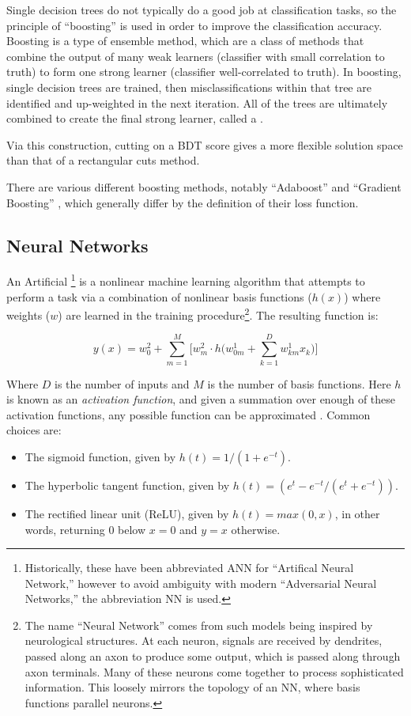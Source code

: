 Single decision trees do not typically do a good job at classification tasks, so the principle of ``boosting'' is used in order to improve the classification accuracy. Boosting is a type of ensemble method, which are a class of methods that combine the output of many weak learners (classifier with small correlation to truth) to form one strong learner (classifier well-correlated to truth). In boosting, single decision trees are trained, then misclassifications within that tree are identified and up-weighted in the next iteration. All of the trees are ultimately combined to create the final strong learner, called a . 

Via this construction, cutting on a \gls{BDT} score gives a more flexible solution space than that of a rectangular cuts method.

There are various different boosting methods, notably ``Adaboost'' \cite{adaboost} and ``Gradient Boosting'' \cite{gradBoost}, which generally differ by the definition of their loss function.


\subsection{Neural Networks}

An Artificial \footnote{Historically, these have been abbreviated ANN for ``Artifical Neural Network,'' however to avoid ambiguity with modern ``Adversarial Neural Networks,'' the abbreviation NN is used.} is a nonlinear machine learning algorithm that attempts to perform a task via a combination of nonlinear basis functions ($h(x)$) where weights ($w$) are learned in the training procedure\footnote{The name ``Neural Network'' comes from such models being inspired by neurological structures. At each neuron, signals are received by dendrites, passed along an axon to produce some output, which is passed along through axon terminals. Many of these neurons come together to process sophisticated information. This loosely mirrors the topology of an \gls{NN}, where basis functions parallel neurons.}. The resulting function is:

\begin{equation}
    y(x) = w_0^2 + \sum_{m=1}^{M} \big [w_m^2 \cdot h \big (w_{0m}^1 + \sum_{k=1}^{D} w_{km}^1 x_k) ]
\end{equation}

Where $D$ is the number of inputs and $M$ is the number of basis functions. Here $h$ is known as an \textit{activation function}, and given a summation over enough of these activation functions, any possible function can be approximated \cite{nn-basis}. Common choices are:
\begin{itemize}
    \item The sigmoid function, given by $h(t) = 1/(1+e^{-t})$.
    \item The hyperbolic tangent function, given by $h(t) = (e^t - e^{-t}/(e^t + e^{-t}))$.
    \item The rectified linear unit (ReLU), given by $h(t)=max(0,x)$, in other words, returning 0 below $x=0$ and $y=x$ otherwise.
\end{itemize}

